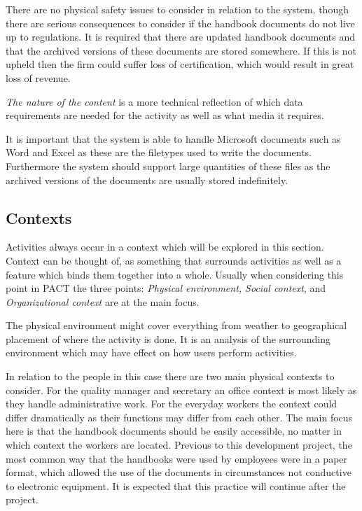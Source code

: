 There are no physical safety issues to consider in relation to the system, though there are serious consequences to consider if the handbook documents do not live up to regulations.
It is required that there are updated handbook documents and that the archived versions of these documents are stored somewhere.
If this is not upheld then the firm could suffer loss of certification, which would result in great loss of revenue.

\textit{The nature of the content} is a more technical reflection of which data requirements are needed for the activity as well as what media it requires.

It is important that the system is able to handle Microsoft documents such as Word and Excel as these are the filetypes used to write the documents.
Furthermore the system should support large quantities of these files as the archived versions of the documents are usually stored indefinitely.

\subsection{Contexts}
Activities always occur in a context which will be explored in this section.
Context can be thought of, as something that surrounds activities as well as a feature which binds them together into a whole.
Usually when considering this point in PACT the three points: \textit{Physical environment, Social context}, and \textit{Organizational context} are at the main focus.

The physical environment might cover everything from weather to geographical placement of where the activity is done.
It is an analysis of the surrounding environment which may have effect on how users perform activities.

In relation to the people in this case there are two main physical contexts to consider.
For the quality manager and secretary an office context is most likely as they handle administrative work.
For the everyday workers the context could differ dramatically as their functions may differ from each other.
The main focus here is that the handbook documents should be easily accessible, no matter in which context the workers are located.
Previous to this development project, the most common way that the handbooks were used by employees were in a paper format, which allowed the use of the documents in circumstances not conductive to electronic equipment.
It is expected that this practice will continue after the project.

